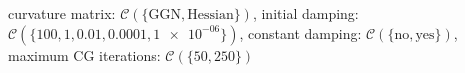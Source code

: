 curvature matrix: $\mathcal{C}(\{\text{GGN},\text{Hessian}\})$, initial damping: $\mathcal{C}(\{100,1,\num[scientific-notation=true]{0.01},\num[scientific-notation=true]{0.0001},\num[scientific-notation=true]{1e-06}\})$, constant damping: $\mathcal{C}(\{\text{no},\text{yes}\})$, maximum CG iterations: $\mathcal{C}(\{50,250\})$